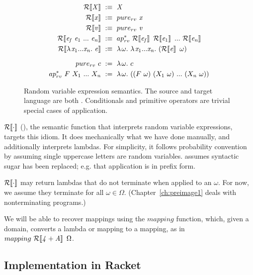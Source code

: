 \begin{figure}[tb]
\centering
\begin{equation*}
\begin{aligned}
	\RV{\mathit{X}} &\ :\equiv\ \mathit{X} \\
	\RV{\mathit{x}} &\ :\equiv\ \purerv~\mathit{x} \\
	\RV{\mathit{v}} &\ :\equiv\ \purerv~\mathit{v} \\
	\RV{\mathit{e_f}~\mathit{e}_1~\dots~\mathit{e_n}}
		&\ :\equiv\ \applyrv~\RV{\mathit{e_f}}~\RV{\mathit{e}_1}~\dots~\RV{\mathit{e_n}} \\
	\RV{\fun {\mathit{x}_1 \dots \mathit{x_n}} \mathit{e}}
		&\ :\equiv\ \fun \omega {\fun {\mathit{x}_1 \dots \mathit{x_n}}(\RV{\mathit{e}}~\omega)}
\\[6pt]
	\purerv~c &\ :=\ \fun \omega c \\
	\applyrv~F~X_1~\dots~X_\mathit{n} &\ :=\ \fun \omega {\papppp {\papp F \omega} {\papp {X_1} \omega} \dots {\papp {X_\mathit{n}} \omega}}
\end{aligned}
\end{equation*}
\hrulefill
\caption[Random variable expression semantics]{Random variable expression semantics. The source and target language are both \targetlang. Conditionals and primitive operators are trivial special cases of application.}
\label{fig:rv}
\end{figure}

$\mathcal{R}\!\left\llbracket{\cdot}\right\rrbracket$ (), the semantic function that interprets random variable expressions, targets this idiom. It does mechanically what we have done manually, and additionally interprets lambdas. For simplicity, it follows probability convention by assuming single uppercase letters are random variables.  assumes syntactic sugar has been replaced; e.g. that application is in prefix form.

$\mathcal{R}\!\left\llbracket{\cdot}\right\rrbracket$ may return lambdas that do not terminate when applied to an $\omega$.
For now, we assume they terminate for all $\omega \in \Omega$.
(Chapter~\ref{ch:preimage1} deals with nonterminating programs.)

We will be able to recover mappings using the $mapping$ function, which, given a domain, converts a lambda or mapping to a mapping, as in $mapping~\mathcal{R}\!\left\llbracket{\mathit{4 + A}}\right\rrbracket~\Omega$.

\subsection{Implementation in Racket}


